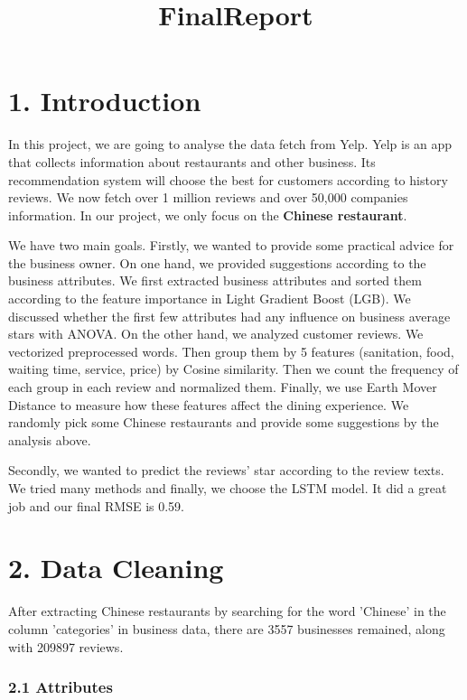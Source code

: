 \documentclass[11pt]{article}
\title{FinalReport}
\begin{document}
    
    
    \maketitle
    
    

    
    \section{1. Introduction}\label{introduction}

    In this project, we are going to analyse the data fetch from Yelp. Yelp
is an app that collects information about restaurants and other
business. Its recommendation system will choose the best for customers
according to history reviews. We now fetch over 1 million reviews and
over 50,000 companies information. In our project, we only focus on the
\textbf{Chinese restaurant}.

We have two main goals. Firstly, we wanted to provide some practical
advice for the business owner. On one hand, we provided suggestions
according to the business attributes. We first extracted business
attributes and sorted them according to the feature importance in Light
Gradient Boost (LGB). We discussed whether the first few attributes had
any influence on business average stars with ANOVA. On the other hand,
we analyzed customer reviews. We vectorized preprocessed words. Then
group them by 5 features (sanitation, food, waiting time, service,
price) by Cosine similarity. Then we count the frequency of each group
in each review and normalized them. Finally, we use Earth Mover Distance
to measure how these features affect the dining experience. We randomly
pick some Chinese restaurants and provide some suggestions by the
analysis above.

Secondly, we wanted to predict the reviews' star according to the review
texts. We tried many methods and finally, we choose the LSTM model. It
did a great job and our final RMSE is 0.59.

    \section{2. Data Cleaning}\label{data-cleaning}

    After extracting Chinese restaurants by searching for the word 'Chinese'
in the column 'categories' in business data, there are 3557 businesses
remained, along with 209897 reviews.

    \subsubsection{2.1 Attributes}\label{attributes}
\end{document}
